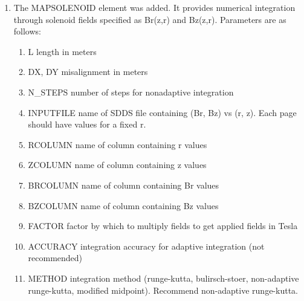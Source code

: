 \begin{enumerate}
\item The MAPSOLENOID element was added.  It provides numerical integration 
through solenoid fields specified as Br(z,r) and Bz(z,r).  Parameters
are as follows:
\begin{enumerate}
\item L               length in meters
\item DX, DY          misalignment in meters
\item N\_STEPS         number of steps for nonadaptive integration
\item INPUTFILE       name of SDDS file containing (Br, Bz) vs (r, z).  
                Each page should have values for a fixed r.
\item RCOLUMN         name of column containing r values
\item ZCOLUMN         name of column containing z values
\item BRCOLUMN        name of column containing Br values
\item BZCOLUMN        name of column containing Bz values
\item FACTOR          factor by which to multiply fields to get applied fields in Tesla
\item ACCURACY        integration accuracy for adaptive integration (not recommended)
\item METHOD          integration method (runge-kutta, bulirsch-stoer, non-adaptive 
                runge-kutta, modified midpoint).  Recommend non-adaptive runge-kutta.
\end{enumerate}


\end{enumerate}
